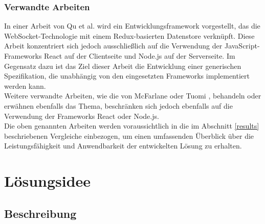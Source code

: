 \documentclass[12pt]{article} %
\begin{document}
\subsubsection{Verwandte Arbeiten}

In einer Arbeit von Qu et al. \cite{qu_websocket-based_2019} wird ein Entwicklungsframework vorgestellt, das die WebSocket-Technologie mit einem Redux-basierten Datenstore verknüpft. Diese Arbeit konzentriert sich jedoch ausschließlich auf die Verwendung der JavaScript-Frameworks React auf der Clientseite und Node.js auf der Serverseite. Im Gegensatz dazu ist das Ziel dieser Arbeit die Entwicklung einer generischen Spezifikation, die unabhängig von den eingesetzten Frameworks implementiert werden kann. \\

Weitere verwandte Arbeiten, wie die von McFarlane \cite{mcfarlane_managing_2019} oder Tuomi \cite{tuomi_automated_2018}, behandeln oder erwähnen ebenfalls das Thema, beschränken sich jedoch ebenfalls auf die Verwendung der Frameworks React oder Node.js. \\

Die oben genannten Arbeiten werden voraussichtlich in die im Abschnitt \ref{results} beschriebenen Vergleiche einbezogen, um einen umfassenden Überblick über die Leistungsfähigkeit und Anwendbarkeit der entwickelten Lösung zu erhalten.

\section{Lösungsidee}

\subsection{Beschreibung}
\end{document}
